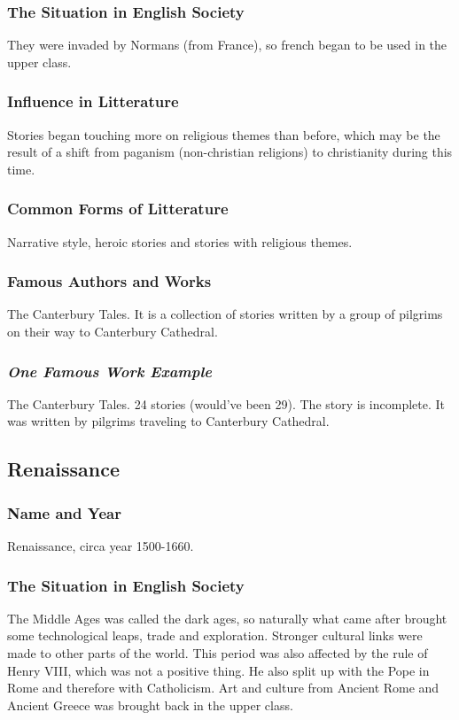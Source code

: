 \subsubsection{The Situation in English Society}
They were invaded by Normans (from France), so french began to be used in the upper class.

\subsubsection{Influence in Litterature}
Stories began touching more on religious themes than before, which may be the result of a shift from paganism (non-christian religions) to christianity during this time.

\subsubsection{Common Forms of Litterature}
Narrative style, heroic stories and stories with religious themes.

\subsubsection{Famous Authors and Works}
The Canterbury Tales. It is a collection of stories written by a group of pilgrims on their way to Canterbury Cathedral.

\subsubsection{\textit{One Famous Work Example}}
The Canterbury Tales. 24 stories (would've been 29). The story is incomplete. It was written by pilgrims traveling to Canterbury Cathedral.

\newpage
\subsection{Renaissance}

\subsubsection{Name and Year}
Renaissance, circa year 1500-1660.

\subsubsection{The Situation in English Society}
The Middle Ages was called the dark ages, so naturally what came after brought some technological leaps, trade and exploration. Stronger cultural links were made to other parts of the world. This period was also affected by the rule of Henry VIII, which was not a positive thing. He also split up with the Pope in Rome and therefore with Catholicism. 
Art and culture from Ancient Rome and Ancient Greece was brought back in the upper class.

